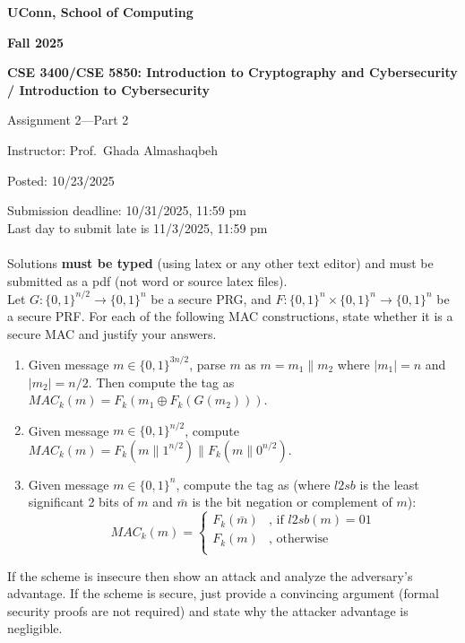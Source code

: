 \documentclass[12pt]{article}
\newcommand{\zo}{\{0,1\}}
\newcommand*\concat{\mathbin{\|}}
\newcommand\xor{\oplus}
\newcommand{\handout}[2]{
\renewcommand{\thepage}{\footnotesize CSE 3400/CSE 5850, #1, p. \arabic{page}}
\begin{center}

\noindent
{\bf UConn, School of Computing}

\noindent
{\bf Fall 2025}

\noindent
{\bf CSE 3400/CSE 5850: Introduction to Cryptography and Cybersecurity \\/ Introduction to Cybersecurity}
\end{center}

\begin{center}
{\Large #1}
\end{center}
}
\begin{document}
\handout{Assignment 2---Part 2}{}

\noindent
{Instructor: Prof.~Ghada Almashaqbeh}

\noindent
{Posted: 10/23/2025}

\noindent
{Submission deadline: 10/31/2025, 11:59 pm} \\
Last day to submit late is 11/3/2025, 11:59 pm\\\\

 Solutions {\bf must be typed} (using latex or any other text editor) and must be submitted as a pdf (not word or source latex files).\\

Let $G:\zo^{n/2} \to \zo^{n}$ be a secure PRG, and $F:\zo^n \times \zo^n \to \zo^n$ be a secure PRF. For each of the following MAC constructions, state whether it is a secure MAC and justify your answers.
\begin{enumerate}
\item Given message $m \in \zo^{3n/2}$, parse $m$ as $m = m_1 \concat m_2$ where $|m_1| = n$ and $|m_2| = n/2$. Then compute the tag as $MAC_k(m) = F_k(m_1 \xor F_k(G(m_2)))$.

\item Given message $m \in \zo^{n/2}$, compute $MAC_k(m) = F_k(m \concat 1^{n/2}) \concat F_k(m \concat 0^{n/2})$.

\item Given message $m \in \zo^{n}$, compute the tag as (where $l2sb$ is the least significant 2 bits of $m$ and $\bar{m}$ is the bit negation or complement of $m$):
\[ MAC_k(m)= \left\{
\begin{array}{ll}
      F_k(\bar{m}) & \text{, if } l2sb(m) = 01 \\
      F_k(m)  & \text{, otherwise} \\
\end{array} 
\right.\]
\end{enumerate} 

 If the scheme is insecure then show an attack and analyze the adversary's advantage. If the scheme is secure, just provide a convincing argument (formal security proofs are not required) and state why the attacker advantage is negligible.\\
\end{document}

